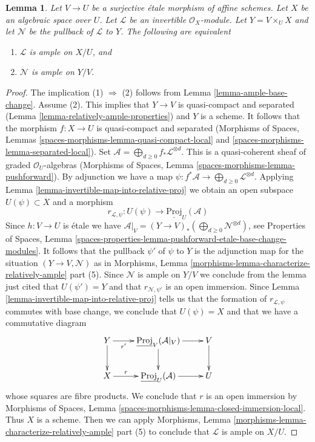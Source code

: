 \documentclass{stacks-project}
\theoremstyle{plain}
\newtheorem{lemma}[subsection]{Lemma}
\theoremstyle{definition}
\theoremstyle{remark}
\numberwithin{equation}{subsection}
\begin{document}
\begin{lemma}
\label{lemma-descend-relatively-ample}
Let $V \to U$ be a surjective \'etale morphism of affine schemes.
Let $X$ be an algebraic space over $U$.
Let $\mathcal{L}$ be an invertible $\mathcal{O}_X$-module.
Let $Y = V \times_U X$ and let $\mathcal{N}$
be the pullback of $\mathcal{L}$ to $Y$.
The following are equivalent
\begin{enumerate}
\item $\mathcal{L}$ is ample on $X/U$, and
\item $\mathcal{N}$ is ample on $Y/V$.
\end{enumerate}
\end{lemma}

\begin{proof}
The implication (1) $\Rightarrow$ (2) follows from
Lemma \ref{lemma-ample-base-change}.
Assume (2). This implies that $Y \to V$ is
quasi-compact and separated (Lemma \ref{lemma-relatively-ample-properties})
and $Y$ is a scheme. It follows that the morphism $f : X \to U$ is
quasi-compact and separated
(Morphisms of Spaces, Lemmas
\ref{spaces-morphisms-lemma-quasi-compact-local} and
\ref{spaces-morphisms-lemma-separated-local}).
Set $\mathcal{A} = \bigoplus_{d \geq 0} f_*\mathcal{L}^{\otimes d}$.
This is a quasi-coherent sheaf of graded $\mathcal{O}_U$-algebras
(Morphisms of Spaces, Lemma \ref{spaces-morphisms-lemma-pushforward}).
By adjunction we have a map
$\psi : f^*\mathcal{A} \to \bigoplus_{d \geq 0} \mathcal{L}^{\otimes d}$.
Applying Lemma \ref{lemma-invertible-map-into-relative-proj}
we obtain an open subspace $U(\psi) \subset X$ and a morphism
$$
r_{\mathcal{L}, \psi} : U(\psi) \to \underline{\text{Proj}}_U(\mathcal{A})
$$
Since $h : V \to U$ is \'etale we have
$\mathcal{A}|_V = (Y \to V)_*(\bigoplus_{d \geq 0} \mathcal{N}^{\otimes d})$,
see Properties of Spaces, Lemma
\ref{spaces-properties-lemma-pushforward-etale-base-change-modules}.
It follows that the pullback $\psi'$ of $\psi$ to
$Y$ is the adjunction map for the situation $(Y \to V, \mathcal{N})$ as in
Morphisms, Lemma \ref{morphisms-lemma-characterize-relatively-ample} part (5).
Since $\mathcal{N}$ is ample on $Y/V$ we conclude from the lemma just
cited that $U(\psi') = Y$ and that $r_{\mathcal{N}, \psi'}$
is an open immersion.
Since Lemma \ref{lemma-invertible-map-into-relative-proj}
tells us that the formation of $r_{\mathcal{L}, \psi}$
commutes with base change, we conclude that
$U(\psi) = X$ and that we have a commutative diagram
$$
\xymatrix{
Y \ar[r]_-{r'} \ar[d] &
\underline{\text{Proj}}_V(\mathcal{A}|_V) \ar[d] \ar[r] &
V \ar[d] \\
X \ar[r]^-r &
\underline{\text{Proj}}_U(\mathcal{A}) \ar[r] &
U
}
$$
whose squares are fibre products. We conclude that $r$ is an
open immersion by
Morphisms of Spaces, Lemma \ref{spaces-morphisms-lemma-closed-immersion-local}.
Thus $X$ is a scheme. Then we can apply
Morphisms, Lemma \ref{morphisms-lemma-characterize-relatively-ample} part (5)
to conclude that $\mathcal{L}$ is ample on $X/U$.
\end{proof}
\end{document}
